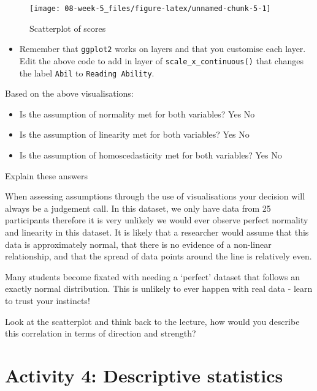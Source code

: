 \documentclass[]{book}
\providecommand{\tightlist}{%
  \setlength{\itemsep}{0pt}\setlength{\parskip}{0pt}}
\begin{document}
\begin{figure}

{\centering \texttt{[image: 08-week-5\_files/figure-latex/unnamed-chunk-5-1]} 

}

\caption{Scatterplot of scores}\label{fig:unnamed-chunk-5}
\end{figure}

\begin{itemize}
\tightlist
\item
  Remember that \texttt{ggplot2} works on layers and that you customise each layer. Edit the above code to add in layer of \texttt{scale\_x\_continuous()} that changes the label \texttt{Abil} to \texttt{Reading\ Ability}.
\end{itemize}

Based on the above visualisations:

\begin{itemize}
\tightlist
\item
  Is the assumption of normality met for both variables? Yes No
\item
  Is the assumption of linearity met for both variables? Yes No
\item
  Is the assumption of homoscedasticity met for both variables? Yes No
\end{itemize}

Explain these answers

When assessing assumptions through the use of visualisations your decision will always be a judgement call. In this dataset, we only have data from 25 participants therefore it is very unlikely we would ever observe perfect normality and linearity in this dataset. It is likely that a researcher would assume that this data is approximately normal, that there is no evidence of a non-linear relationship, and that the spread of data points around the line is relatively even.

Many students become fixated with needing a `perfect' dataset that follows an exactly normal distribution. This is unlikely to ever happen with real data - learn to trust your instincts!

Look at the scatterplot and think back to the lecture, how would you describe this correlation in terms of direction and strength?

\hypertarget{activity-4-descriptive-statistics-1}{%
\section{Activity 4: Descriptive statistics}\label{activity-4-descriptive-statistics-1}}
\end{document}
